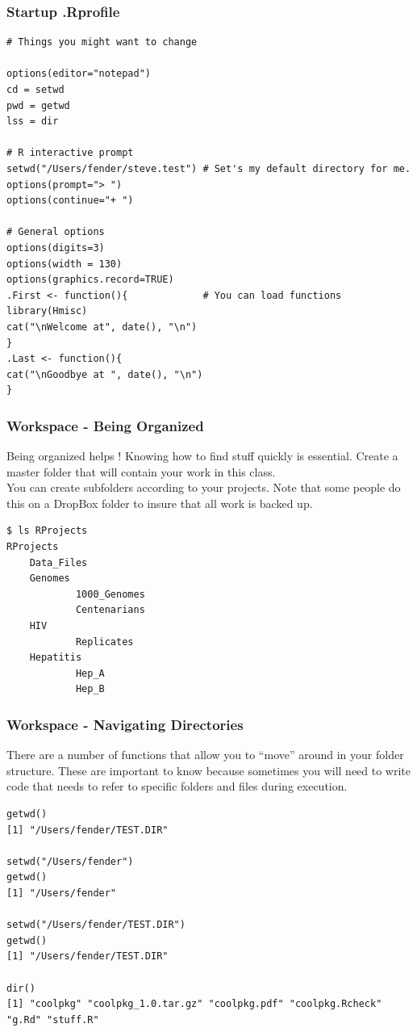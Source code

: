 \documentclass{beamer}
\begin{document}
\begin{frame}[fragile]
\frametitle{Startup .Rprofile}
\scriptsize
\begin{verbatim}
# Things you might want to change

options(editor="notepad")
cd = setwd
pwd = getwd
lss = dir

# R interactive prompt
setwd("/Users/fender/steve.test") # Set's my default directory for me.
options(prompt="> ")
options(continue="+ ")

# General options
options(digits=3)
options(width = 130)
options(graphics.record=TRUE)
.First <- function(){             # You can load functions
library(Hmisc)
cat("\nWelcome at", date(), "\n")
}
.Last <- function(){
cat("\nGoodbye at ", date(), "\n")
}
\end{verbatim}
\end{frame}


\begin{frame}[fragile]
\frametitle{Workspace - Being Organized}
Being organized helps ! Knowing how to find stuff quickly is essential. Create a master folder that will contain your work in this class. 
\newline
\\
You can create subfolders according to your projects. Note that some people do this on a DropBox folder to insure that all work is backed up.  
\\
\footnotesize
\begin{verbatim}
$ ls RProjects
RProjects
    Data_Files
    Genomes
            1000_Genomes
            Centenarians
    HIV
            Replicates
    Hepatitis
            Hep_A
            Hep_B
\end{verbatim}
\end{frame}

\begin{frame}[fragile]
\frametitle{Workspace - Navigating Directories}
There are a number of functions that allow you to ``move'' around in your folder structure. These are important to know because sometimes you will need to write code that needs to refer to specific folders and files during execution.
\scriptsize
\begin{verbatim}
getwd()
[1] "/Users/fender/TEST.DIR"

setwd("/Users/fender")
getwd()
[1] "/Users/fender"

setwd("/Users/fender/TEST.DIR")
getwd()
[1] "/Users/fender/TEST.DIR"

dir()
[1] "coolpkg" "coolpkg_1.0.tar.gz" "coolpkg.pdf" "coolpkg.Rcheck"
"g.Rd" "stuff.R"
\end{verbatim}
\end{frame}
\end{document}

